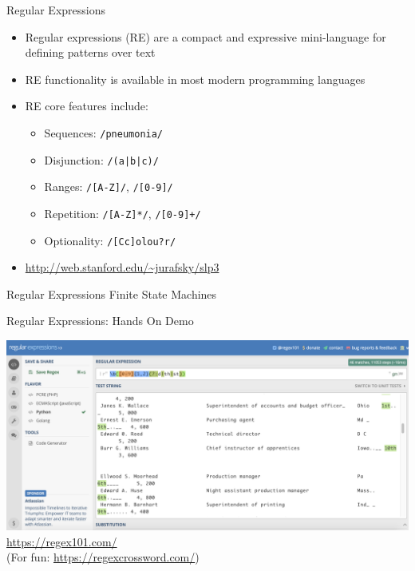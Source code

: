 \documentclass[10pt]{beamer}
\begin{document}
\begin{frame}{Regular Expressions}
\begin{itemize}
  \item \alert{Regular expressions} (RE) are a compact and expressive mini-language for defining \alert{patterns} over text
  \item RE functionality is available in most modern programming languages
  \item RE core features include:
  \begin{itemize}
    \item Sequences: \texttt{/pneumonia/}
    \item Disjunction: \texttt{/(a|b|c)/}
    \item Ranges: \texttt{/[A-Z]/}, \texttt{/[0-9]/}
    \item Repetition: \texttt{/[A-Z]*/}, \texttt{/[0-9]+/}
    \item Optionality: \texttt{/[Cc]olou?r/}
  \end{itemize}
  \item \textcolor{blue}{\url{http://web.stanford.edu/~jurafsky/slp3}}
\end{itemize}
\end{frame}

\begin{frame}{Regular Expressions}
Finite State Machines
\end{frame}

\begin{frame}[fragile]{Regular Expressions: Hands On Demo}

\begin{center}
  \includegraphics[scale=0.25]{figures/regex101-screenshot.png}
  \\ \vspace{1em}
  \textcolor{blue}{\url{https://regex101.com/}}
  \\
  (For fun: \textcolor{blue}{\url{https://regexcrossword.com/}})
\end{center}

\end{frame}
\end{document}
